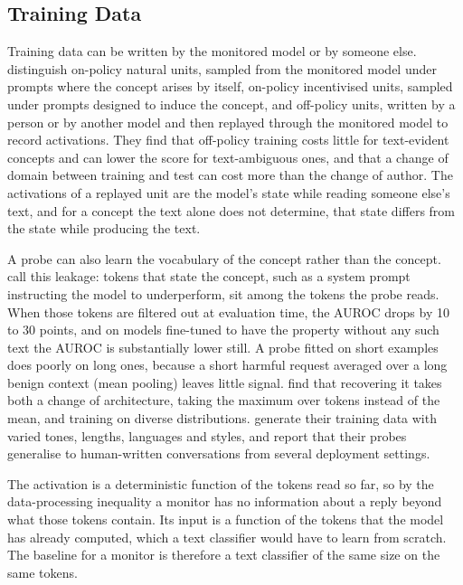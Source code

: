 \documentclass{article}
\begin{document}
\subsection{Training Data}
\label{sec:data}

Training data can be written by the monitored model or by someone else. \cite{kirch2025} distinguish on-policy natural units, sampled from the monitored model under prompts where the concept arises by itself, on-policy incentivised units, sampled under prompts designed to induce the concept, and off-policy units, written by a person or by another model and then replayed through the monitored model to record activations. They find that off-policy training costs little for text-evident concepts and can lower the score for text-ambiguous ones, and that a change of domain between training and test can cost more than the change of author. The activations of a replayed unit are the model's state while reading someone else's text, and for a concept the text alone does not determine, that state differs from the state while producing the text.

A probe can also learn the vocabulary of the concept rather than the concept. \cite{boxo2025} call this leakage: tokens that state the concept, such as a system prompt instructing the model to underperform, sit among the tokens the probe reads. When those tokens are filtered out at evaluation time, the AUROC drops by 10 to 30 points, and on models fine-tuned to have the property without any such text the AUROC is substantially lower still. A probe fitted on short examples does poorly on long ones, because a short harmful request averaged over a long benign context (mean pooling) leaves little signal. \cite{kramar2026} find that recovering it takes both a change of architecture, taking the maximum over tokens instead of the mean, and training on diverse distributions. \cite{mckenzie2025} generate their training data with varied tones, lengths, languages and styles, and report that their probes generalise to human-written conversations from several deployment settings.

The activation is a deterministic function of the tokens read so far, so by the data-processing inequality a monitor has no information about a reply beyond what those tokens contain. Its input is a function of the tokens that the model has already computed, which a text classifier would have to learn from scratch. The baseline for a monitor is therefore a text classifier of the same size on the same tokens.
\end{document}
